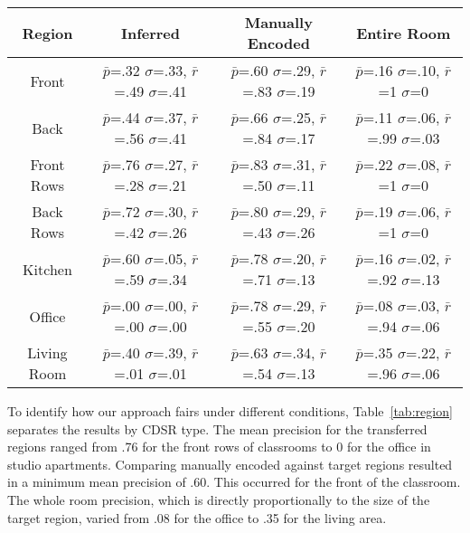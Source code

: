 \begin{table*}
	\center
\begin{tabular}{|c|c|c|c|}
\hline
Region & Inferred & Manually Encoded & Entire Room \\
\hline
Front & $\bar{p}$=.32 $\sigma$=.33, $\bar{r}$=.49 $\sigma$=.41 & $\bar{p}$=.60 $\sigma$=.29, $\bar{r}$=.83 $\sigma$=.19  & $\bar{p}$=.16 $\sigma$=.10, $\bar{r}$=1 $\sigma$=0  \\
\hline
Back & $\bar{p}$=.44 $\sigma$=.37, $\bar{r}$=.56 $\sigma$=.41 & $\bar{p}$=.66 $\sigma$=.25, $\bar{r}$=.84 $\sigma$=.17  & $\bar{p}$=.11 $\sigma$=.06, $\bar{r}$=.99 $\sigma$=.03  \\
\hline
Front Rows & $\bar{p}$=.76 $\sigma$=.27, $\bar{r}$=.28 $\sigma$=.21 & $\bar{p}$=.83 $\sigma$=.31, $\bar{r}$=.50 $\sigma$=.11  & $\bar{p}$=.22 $\sigma$=.08, $\bar{r}$=1 $\sigma$=0  \\
\hline
Back Rows & $\bar{p}$=.72 $\sigma$=.30, $\bar{r}$=.42 $\sigma$=.26 & $\bar{p}$=.80 $\sigma$=.29, $\bar{r}$=.43 $\sigma$=.26  & $\bar{p}$=.19 $\sigma$=.06, $\bar{r}$=1 $\sigma$=0  \\
\hline
Kitchen & $\bar{p}$=.60 $\sigma$=.05, $\bar{r}$=.59 $\sigma$=.34 & $\bar{p}$=.78 $\sigma$=.20, $\bar{r}$=.71 $\sigma$=.13  & $\bar{p}$=.16 $\sigma$=.02, $\bar{r}$=.92 $\sigma$=.13  \\
\hline
Office & $\bar{p}$=.00 $\sigma$=.00, $\bar{r}$=.00 $\sigma$=.00 & $\bar{p}$=.78 $\sigma$=.29, $\bar{r}$=.55 $\sigma$=.20  & $\bar{p}$=.08 $\sigma$=.03, $\bar{r}$=.94 $\sigma$=.06  \\
\hline
Living Room & $\bar{p}$=.40 $\sigma$=.39, $\bar{r}$=.01 $\sigma$=.01 & $\bar{p}$=.63 $\sigma$=.34, $\bar{r}$=.54 $\sigma$=.13  & $\bar{p}$=.35 $\sigma$=.22, $\bar{r}$=.96 $\sigma$=.06  \\
\hline
\end{tabular}
\caption{Performance by Region Type}
  \label{tab:region}	
\end{table*}

To identify how our approach fairs under different conditions, Table~\ref{tab:region} separates the results by CDSR type. The mean precision for the transferred regions ranged from .76 for the front rows of classrooms to 0 for the office in studio apartments. Comparing manually encoded against target regions resulted in a minimum mean precision of .60. This occurred for the front of the classroom. The whole room precision, which is directly proportionally to the size of the target region, varied from .08 for the office to .35 for the living area.

